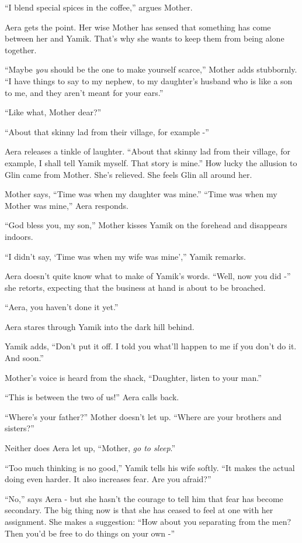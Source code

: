 \documentclass[twoside,11pt]{book}
\begin{document}
``I blend special spices in the coffee,'' argues Mother.

Aera gets the point. Her wise Mother has sensed that something has come between her and Yamik. That's why she wants to
keep them from being alone together.

``Maybe \textit{you} should be the one to make yourself scarce,'' Mother adds stubbornly. ``I have things to say to my
nephew, to my daughter's husband who is like a son to me, and they aren't meant for your ears.''

``Like what, Mother dear?''

``About that skinny lad from their village, for example -''

Aera releases a tinkle of laughter.  ``About that skinny lad from their village, for example, I shall tell Yamik myself.
That story is mine.'' How lucky the allusion to Glin came from Mother. She's relieved. She feels Glin all around her.

Mother says, ``Time was when my daughter was mine.''
``Time was when my Mother was mine,'' Aera responds.

``God bless you, my son,'' Mother kisses Yamik on the forehead and disappears indoors.

``I didn't say, `Time was when my wife was mine','' Yamik remarks.

Aera doesn't quite know what to make of Yamik's words. ``Well, now you did
-'' she retorts, expecting that the business at hand is about to be broached.

``Aera, you haven't done it yet.''

Aera stares through Yamik into the dark hill behind.

Yamik adds, ``Don't put it off. I told you what'll happen to me if you don't do it. And soon.''

Mother's voice is heard from the shack, ``Daughter, listen to your man.''

``This is between the two of us!'' Aera calls back.

``Where's your father?''  Mother doesn't let up. ``Where are your brothers
and sisters?''

Neither does Aera let up, ``Mother, \textit{go to sleep}.''

``Too much thinking is no good,'' Yamik tells his wife softly. ``It makes the actual doing
even harder. It also increases fear. Are you afraid?''

``No,'' says Aera - but she hasn't the courage to tell him that fear has
become secondary. The big thing now is that she has ceased to feel at one with her assignment. She makes a suggestion:
``How about you separating from the men? Then you'd be free to do things on your own -''
\end{document}
